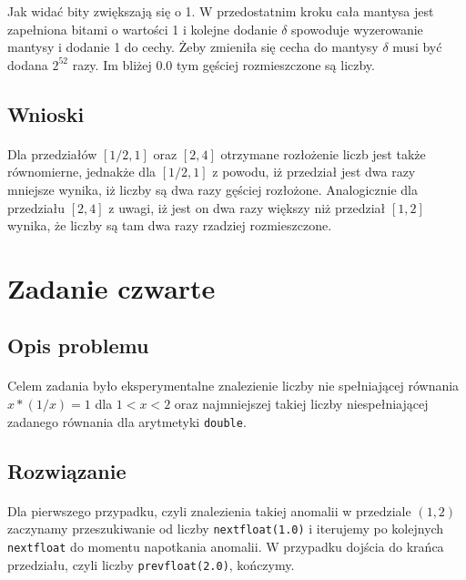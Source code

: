 \documentclass[a4paper]{article}
\begin{document}
Jak widać bity zwiększają się o 1. W przedostatnim kroku cała mantysa jest zapełniona bitami o wartości 1 i kolejne dodanie $\delta$ spowoduje wyzerowanie mantysy i dodanie 1 do cechy. Żeby zmieniła się cecha do mantysy $\delta$ musi być dodana $2^{52}$ razy. Im bliżej 0.0 tym gęściej rozmieszczone są liczby.

\subsection{Wnioski}
\paragraph{}
Dla przedziałów $[1/2, 1]$ oraz $[2, 4]$ otrzymane rozłożenie liczb jest także równomierne, jednakże dla $[1/2, 1]$ z powodu, iż przedział jest dwa razy mniejsze wynika, iż liczby są dwa razy gęściej rozłożone. Analogicznie dla przedziału $[2, 4]$ z uwagi, iż jest on dwa razy większy niż przedział $[1, 2]$ wynika, że liczby są tam dwa razy rzadziej rozmieszczone. 

\section{Zadanie czwarte}

\subsection{Opis problemu}
\paragraph{}
Celem zadania było eksperymentalne znalezienie liczby nie spełniającej równania $x * (1/x) = 1$ dla $1 < x < 2$ oraz najmniejszej takiej liczby niespełniającej zadanego równania dla arytmetyki \texttt{double}.

\subsection{Rozwiązanie}
\paragraph{}
Dla pierwszego przypadku, czyli znalezienia takiej anomalii w przedziale $(1, 2)$ zaczynamy przeszukiwanie od liczby \texttt{nextfloat(1.0)} i iterujemy po kolejnych \texttt{nextfloat} do momentu napotkania anomalii. W przypadku dojścia do krańca przedziału, czyli liczby \texttt{prevfloat(2.0)}, kończymy.
\end{document}
